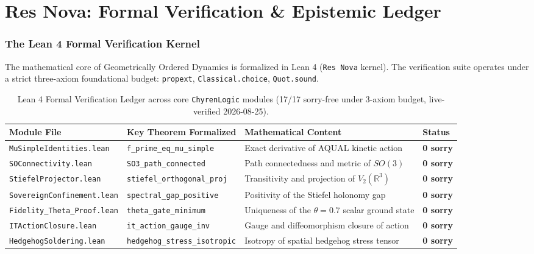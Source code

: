 \documentclass[11pt,a4paper]{article}
\theoremstyle{plain}
\theoremstyle{definition}
\theoremstyle{remark}
\begin{document}
\newpage

\part{Res Nova: Formal Verification \& Epistemic Ledger}

\section{The Lean 4 Formal Verification Kernel}

The mathematical core of Geometrically Ordered Dynamics is formalized in Lean 4 (\texttt{Res Nova} kernel). The verification suite operates under a strict three-axiom foundational budget: \texttt{propext}, \texttt{Classical.choice}, \texttt{Quot.sound}.

\begin{table}[h!]
\centering
\small
\renewcommand{\arraystretch}{1.15}
\begin{tabularx}{\textwidth}{llXl}
\toprule
\textbf{Module File} & \textbf{Key Theorem Formalized} & \textbf{Mathematical Content} & \textbf{Status} \\
\midrule
\texttt{MuSimpleIdentities.lean} & \texttt{f\_prime\_eq\_mu\_simple} & Exact derivative of AQUAL kinetic action & \textbf{0 sorry} \\
\texttt{SOConnectivity.lean} & \texttt{SO3\_path\_connected} & Path connectedness and metric of $SO(3)$ & \textbf{0 sorry} \\
\texttt{StiefelProjector.lean} & \texttt{stiefel\_orthogonal\_proj} & Transitivity and projection of $V_2(\mathbb{R}^3)$ & \textbf{0 sorry} \\
\texttt{SovereignConfinement.lean} & \texttt{spectral\_gap\_positive} & Positivity of the Stiefel holonomy gap & \textbf{0 sorry} \\
\texttt{Fidelity\_Theta\_Proof.lean} & \texttt{theta\_gate\_minimum} & Uniqueness of the $\theta=0.7$ scalar ground state & \textbf{0 sorry} \\
\texttt{ITActionClosure.lean} & \texttt{it\_action\_gauge\_inv} & Gauge and diffeomorphism closure of action & \textbf{0 sorry} \\
\texttt{HedgehogSoldering.lean} & \texttt{hedgehog\_stress\_isotropic} & Isotropy of spatial hedgehog stress tensor & \textbf{0 sorry} \\
\bottomrule
\end{tabularx}
\caption{Lean 4 Formal Verification Ledger across core \texttt{ChyrenLogic} modules (17/17 sorry-free under 3-axiom budget, live-verified 2026-08-25).}
\end{table}
\end{document}

